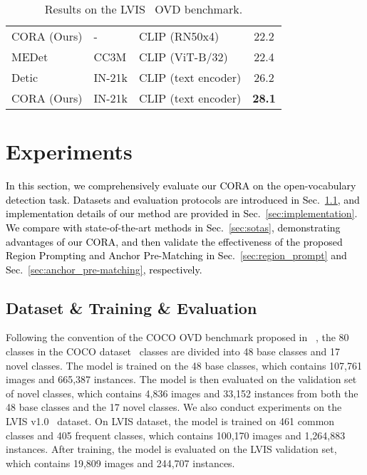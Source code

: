 \documentclass[10pt,twocolumn,letterpaper]{article}
\begin{document}
\begin{table}[]
{\begin{tabular}{l|ll|c}
CORA (Ours)                                  & -                             & CLIP (RN50x4)                        & 22.2                       \\
MEDet~\cite{medet}                                        & CC3M                          & CLIP (ViT-B/32)                      & 22.4                     \\
Detic~\cite{detic}                                        & IN-21k                  & CLIP (text encoder)                  & 26.2                     \\
CORA (Ours)                                  & IN-21k                             & CLIP (text encoder)                        & \textbf{28.1}                       \\
\bottomrule
\end{tabular}
}
\caption{Results on the LVIS~\cite{LVIS} OVD benchmark.}
\label{tab:ovd_lvis}
\end{table} 
\section{Experiments}
\label{sec:exp}


\textcolor{black}{In this section, we comprehensively evaluate our CORA on the open-vocabulary detection task. Datasets and evaluation protocols are introduced in Sec.~\ref{sec:dataset}, and implementation details of our method are provided in Sec.~\ref{sec:implementation}. We compare with state-of-the-art methods in Sec.~\ref{sec:sotas}, demonstrating advantages of our CORA, and then validate the effectiveness of the proposed Region Prompting and Anchor Pre-Matching in Sec.~\ref{sec:region_prompt} and Sec.~\ref{sec:anchor_pre-matching}, respectively.}

\subsection{Dataset \& Training \& Evaluation}
\label{sec:dataset}


Following the convention of the COCO OVD benchmark proposed in ~\cite{zsd}, the 80 classes in the COCO dataset~\cite{COCO} classes are divided into 48 base classes and 17 novel classes.
The model is trained on the 48 base classes, which contains 107,761 images and 665,387 instances.
The model is then evaluated on the validation set of novel classes, which contains 4,836 images and 33,152 instances from both the 48 base classes and the 17 novel classes.
We also conduct experiments on the LVIS v1.0~\cite{LVIS} dataset.
On LVIS dataset, the model is trained on 461 common classes and 405 frequent classes, which contains 100,170 images and 1,264,883 instances.
After training, the model is evaluated on the LVIS validation set, which contains 19,809 images and 244,707 instances.
\end{document}
